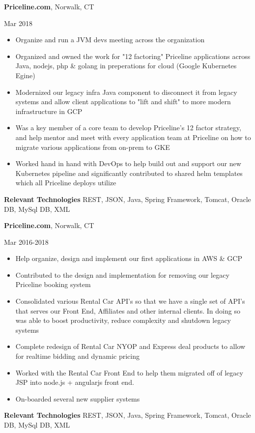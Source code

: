 \documentclass[a4paper,online]{adcv}
\begin{document}
\begin{adcvtabletwo}
  {\textbf{Priceline.com}, Norwalk, CT}
  
   {Mar 2018}
  \begin{itemize}
    \item Organize and run a JVM devs meeting across the organization
    \item Organized and owned the work for "12 factoring" Priceline applications across Java, nodejs, php \& golang in preperations for cloud (Google Kubernetes Egine)
    \item Modernized our legacy infra Java component to disconnect it from legacy systems and allow client applications to "lift and shift" to more modern infrastructure in GCP
    \item Was a key member of a core team to develop Priceline's 12 factor strategy, and help mentor and meet with every application team at Priceline on how to migrate various applications from on-prem to GKE
    \item Worked hand in hand with DevOps to help build out and support our new Kubernetes pipeline and significantly contributed to shared helm templates which all Priceline deploys utilize
  \end{itemize}
  \adcvrowskip
    \adcvrowskip
  \textbf{Relevant Technologies} REST, JSON, Java, Spring Framework, Tomcat, Oracle DB, MySql DB, XML
  
  {\textbf{Priceline.com}, Norwalk, CT}
  
   {Mar 2016-2018}
  \begin{itemize}
    \item Help organize, design and implement our first applications in AWS \& GCP
    \item Contributed to the design and implementation for removing our legacy Priceline booking system
    \item Consolidated various Rental Car API's so that we have a single set of API's that serves our Front End, Affiliates and other internal clients. In doing so was able to boost productivity, reduce complexity and shutdown legacy systems
    \item Complete redesign of Rental Car NYOP and Express deal products to allow for realtime bidding and dynamic pricing
    \item Worked with the Rental Car Front End to help them migrated off of legacy JSP into node.js + angularjs front end.
    \item On-boarded several new supplier systems
  \end{itemize}
    \adcvrowskip
  \textbf{Relevant Technologies} REST, JSON, Java, Spring Framework, Tomcat, Oracle DB, MySql DB, XML
  

\end{adcvtabletwo}
\end{document}
